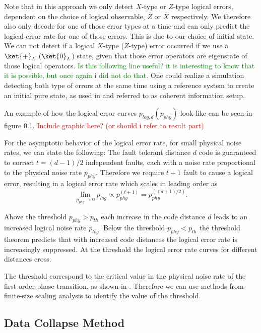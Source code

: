 Note that in this approach we only detect $X$-type or $Z$-type logical errors, dependent on the choice of logical observable, $\bar{Z}$ or $\bar{X}$ respectively.
We therefore also only decode for one of those error types at a time and can only predict the logical error rate for one of those errors.
This is due to our choice of initial state.
We can not detect if a logical $X$-type ($Z$-type) error occurred if we use a $\ket{+}_L$ ($\ket{0}_L$) state, given that those error operators are eigenstate of those logical operators.
\textcolor{green}{Is this following line useful? it is interesting to know that it is possible, but once again i did not do that.}
One could realize a simulation detecting both type of errors at the same time using a reference system to create an initial pure state, as used in \cite{quantum_data_processing,fundamental_thresholds} and referred to as coherent information setup.


An example of how the logical error curves $p_{log,d}(p_{phy})$ look like can be seen in figure \ref{}.
\textcolor{red}{Include graphic here? (or should i refer to result part)}

For the asymptotic behavior of the logical error rate, for small physical noise rates, we can state the following:
The fault tolerant distance $d$ code is guaranteed to correct $t=(d-1)/2$ independent faults, each with a noise rate proportional to the physical noise rate $p_{phy}$.
Therefore we require $t+1$ fault to cause a logical error, resulting in a logical error rate which scales in leading order as 
\begin{equation}
    \lim_{p_{phy} \rightarrow 0} p_{log} \propto  p_{phy}^{(t+1)}= p_{phy}^{((d+1)/2)}.
\end{equation}

Above the threshold $p_{phy}>p_{th}$ each increase in the code distance $d$ leads to an increased logical noise rate $p_{log}$.
Below the threshold $p_{phy}<p_{th}$ the threshold theorem predicts that with increased code distances the logical error rate is increasingly suppressed.
At the threshold the logical error rate curves for different distances cross.

The threshold correspond to the critical value in the physical noise rate of the first-order phase transition, as shown in \cite{fundamental_thresholds}.
Therefore we can use methods from finite-size scaling analysis to identify the value of the threshold. 

\subsection{Data Collapse Method}

